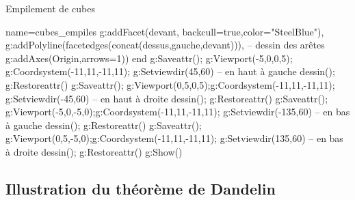\begin{demo}{Empilement de cubes}
\begin{luadraw}{name=cubes_empiles}
        g:addFacet(devant, {backcull=true,color="SteelBlue"}),
        g:addPolyline(facetedges(concat(dessus,gauche,devant))), -- dessin des arêtes
        g:addAxes(Origin,{arrows=1}))
end
g:Saveattr(); g:Viewport(-5,0,0,5); g:Coordsystem(-11,11,-11,11); g:Setviewdir(45,60) -- en haut à gauche
 dessin(); g:Restoreattr()
g:Saveattr(); g:Viewport(0,5,0,5);g:Coordsystem(-11,11,-11,11); g:Setviewdir(-45,60) -- en haut à droite
dessin(); g:Restoreattr()
g:Saveattr(); g:Viewport(-5,0,-5,0);g:Coordsystem(-11,11,-11,11); g:Setviewdir(-135,60) -- en bas à gauche
dessin(); g:Restoreattr()
g:Saveattr(); g:Viewport(0,5,-5,0);g:Coordsystem(-11,11,-11,11); g:Setviewdir(135,60) -- en bas à droite
dessin(); g:Restoreattr()
g:Show()
\end{luadraw}
\end{demo}


\subsection{Illustration du théorème de Dandelin}

